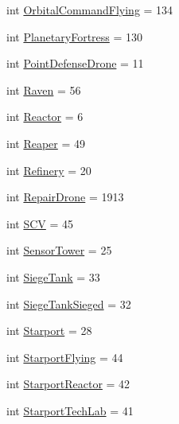 \begin{DoxyCompactItemize}
\item 
int \mbox{\hyperlink{classpysc2_1_1lib_1_1units_1_1_terran_ac623db2a98aacf920b91b157888ae6c4}{Orbital\+Command\+Flying}} = 134
\item 
int \mbox{\hyperlink{classpysc2_1_1lib_1_1units_1_1_terran_a368f5206afc3bdcd0bad5ab209962db5}{Planetary\+Fortress}} = 130
\item 
int \mbox{\hyperlink{classpysc2_1_1lib_1_1units_1_1_terran_a31cd4699e1c60f8e7711b7e026f38b1b}{Point\+Defense\+Drone}} = 11
\item 
int \mbox{\hyperlink{classpysc2_1_1lib_1_1units_1_1_terran_a2a62fba54d8fd24cbf32de3e1abb8bd4}{Raven}} = 56
\item 
int \mbox{\hyperlink{classpysc2_1_1lib_1_1units_1_1_terran_adf698d5900157afbc2a7033bcdbcc442}{Reactor}} = 6
\item 
int \mbox{\hyperlink{classpysc2_1_1lib_1_1units_1_1_terran_a10fa61234a4add472bffa2bcc09c1148}{Reaper}} = 49
\item 
int \mbox{\hyperlink{classpysc2_1_1lib_1_1units_1_1_terran_a038515b1c1fdc35e519285454a34819a}{Refinery}} = 20
\item 
int \mbox{\hyperlink{classpysc2_1_1lib_1_1units_1_1_terran_a253904fe3277d5d551f9f9262db61247}{Repair\+Drone}} = 1913
\item 
int \mbox{\hyperlink{classpysc2_1_1lib_1_1units_1_1_terran_a9cb15c619e064e7e3ea6748c2ecc0087}{S\+CV}} = 45
\item 
int \mbox{\hyperlink{classpysc2_1_1lib_1_1units_1_1_terran_a3b0097ee2ad4d531d4736b36f0efde35}{Sensor\+Tower}} = 25
\item 
int \mbox{\hyperlink{classpysc2_1_1lib_1_1units_1_1_terran_ae712a25676ab88122c4604fef3ae0c3e}{Siege\+Tank}} = 33
\item 
int \mbox{\hyperlink{classpysc2_1_1lib_1_1units_1_1_terran_ad6c3b2f385f73aac015da29c6d1590c6}{Siege\+Tank\+Sieged}} = 32
\item 
int \mbox{\hyperlink{classpysc2_1_1lib_1_1units_1_1_terran_a492c7703a770e1c09857edded700cc14}{Starport}} = 28
\item 
int \mbox{\hyperlink{classpysc2_1_1lib_1_1units_1_1_terran_a7ecb33a4194bda4c6a05b5cd8edbeae6}{Starport\+Flying}} = 44
\item 
int \mbox{\hyperlink{classpysc2_1_1lib_1_1units_1_1_terran_ab6a904aebaf8fc683fc4a941c628074f}{Starport\+Reactor}} = 42
\item 
int \mbox{\hyperlink{classpysc2_1_1lib_1_1units_1_1_terran_aa33c332c8919861536b7b87ece80be4a}{Starport\+Tech\+Lab}} = 41
\item 

\end{DoxyCompactItemize}
